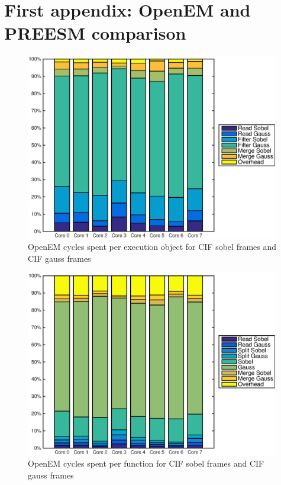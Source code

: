 \chapter{First appendix: OpenEM and PREESM comparison}
\label{chapter:first-appendix}

\begin{figure}[h!]
    \begin{center}
        \includegraphics[width=0.99\textwidth]{images/openem_cifcif_8cores_eo.eps}
        \caption{OpenEM cycles spent per execution object for CIF sobel frames and CIF gauss frames}
    \end{center}
\end{figure}

\begin{figure}[h!]
    \begin{center}
        \includegraphics[width=0.99\textwidth]{images/openem_cifcif_8cores_func.eps}
        \caption{OpenEM cycles spent per function for CIF sobel frames and CIF gauss frames}
    \end{center}
\end{figure}


